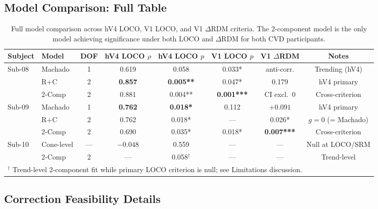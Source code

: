\documentclass{article}
\begin{document}
\subsection{Model Comparison: Full Table}

\begin{table}[h]
  \caption{Full model comparison across hV4 LOCO, V1 LOCO, and V1 $\Delta$RDM criteria. The 2-component model is the only model achieving significance under both LOCO and $\Delta$RDM for both CVD participants.}
  \label{tab:full}
  \begin{center}
    \begin{small}
      \begin{tabular}{llcccccc}
        \toprule
        Subject & Model & DOF & hV4 LOCO $\rho$ & hV4 LOCO $p$ & V1 LOCO $p$ & V1 $\Delta$RDM & Notes \\
        \midrule
        \multirow{3}{*}{Sub-08} & Machado & 1 & 0.619 & 0.058 & 0.033* & anti-corr. & Trending (hV4) \\
        & R+C & 2 & \textbf{0.857} & \textbf{0.005**} & 0.047* & 0.179 & hV4 primary \\
        & 2-Comp & 2 & 0.881 & 0.004** & \textbf{0.001***} & CI excl.\ 0 & Cross-criterion \\
        \midrule
        \multirow{3}{*}{Sub-09} & Machado & 1 & \textbf{0.762} & \textbf{0.018*} & 0.112 & $+0.091$ & hV4 primary \\
        & R+C & 2 & 0.762 & 0.018* & --- & 0.026* & $g{=}0$ (= Machado) \\
        & 2-Comp & 2 & 0.690 & 0.035* & 0.018* & \textbf{0.007***} & Cross-criterion \\
        \midrule
        Sub-10 & Cone-level & --- & $-0.048$ & 0.559 & --- & --- & Null at LOCO/SRM \\
        & 2-Comp & 2 & --- & 0.058$^\dagger$ & --- & --- & Trend-level \\
        \bottomrule
        \multicolumn{8}{l}{\small $^\dagger$ Trend-level 2-component fit while primary LOCO criterion is null; see Limitations discussion.} \\
      \end{tabular}
    \end{small}
  \end{center}
\end{table}

\subsection{Correction Feasibility Details}
\end{document}
